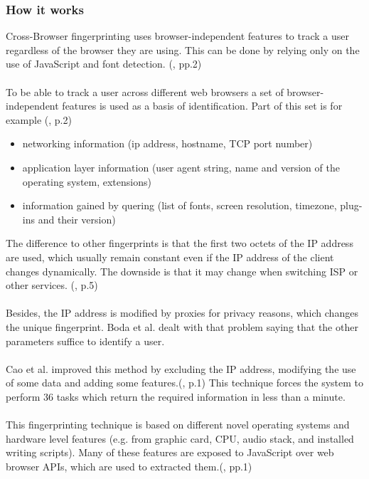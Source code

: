 \subsubsection{How it works}
Cross-Browser fingerprinting uses browser-independent features to track a user regardless of the browser they are using. This can be done by relying only on the use of JavaScript and font detection. (\textcite{upi15}, pp.2)\\\\
To be able to track a user across different web browsers a set of browser-independent features is used as a basis of identification. Part of this set is for example (\textcite{boda11}, p.2)
\begin{itemize}
	\item networking information (ip address, hostname, TCP port number)
	\item application layer information (user agent string, name and version of the operating system, extensions)
	\item information gained by quering (list of fonts, screen resolution, timezone, plug-ins and their version)\\
\end{itemize}
The difference to other fingerprints is that the first two octets of the IP address are used, which usually remain constant even if the IP address of the client changes dynamically. The downside is that it may change when switching ISP or other services. (\textcite{boda11}, p.5)\\\\
Besides, the IP address is modified by proxies for privacy reasons, which changes the unique fingerprint. Boda et al. dealt with that problem saying that the other parameters suffice to identify a user.\\\\
Cao et al. improved this method by excluding the IP address, modifying the use of some data and adding some features.(\textcite{Cao17}, p.1) This technique forces the system to perform 36 tasks which return the required information in less than a minute.\\\\
This fingerprinting technique is based on different novel operating systems and hardware level features (e.g. from graphic card, CPU, audio stack, and installed writing scripts). Many of these features are exposed to JavaScript over web browser APIs, which are used to extracted them.(\textcite{Cao17}, pp.1)\\\\
